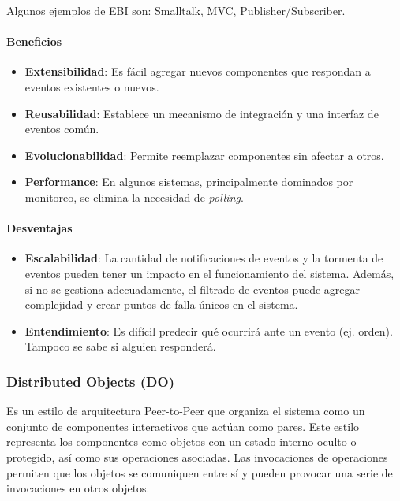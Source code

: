 \documentclass{article}
\begin{document}
			
			Algunos ejemplos de EBI son: Smalltalk, MVC, Publisher/Subscriber.
			
			\paragraph{Beneficios}
				\begin{itemize}	
					\item {\textbf{Extensibilidad}}: Es fácil agregar nuevos componentes que respondan a
					eventos existentes o nuevos.
					
					\item {\textbf{Reusabilidad}}: Establece un mecanismo de integración y una interfaz
					de eventos común.
					
					\item {\textbf{Evolucionabilidad}}: Permite reemplazar componentes sin afectar a otros.
					
					\item {\textbf{Performance}}: En algunos sistemas, principalmente dominados por
					monitoreo, se elimina la necesidad de \textit{polling}.
					
				\end{itemize}
			
			\paragraph{Desventajas}
				\begin{itemize}	
					
					\item {\textbf{Escalabilidad}}: La cantidad de notificaciones de eventos y la tormenta de 
					eventos pueden tener un impacto en el funcionamiento del sistema. Además, si no se gestiona adecuadamente, el filtrado de eventos puede agregar complejidad y crear puntos de falla únicos en el sistema.
								
					\item {\textbf{Entendimiento}}: Es difícil predecir qué ocurrirá ante un evento (ej. orden).
					Tampoco se sabe si alguien responderá.			
					
				\end{itemize}
			
			
			\subsubsection{Distributed Objects (DO)}
			Es un estilo de arquitectura Peer-to-Peer que organiza el sistema como un conjunto de componentes interactivos que actúan como pares. Este estilo representa los componentes como objetos con un estado interno oculto o protegido, así como sus operaciones asociadas. Las invocaciones de operaciones permiten que los objetos se comuniquen entre sí y pueden provocar una serie de invocaciones en otros objetos.
			
\end{document}

